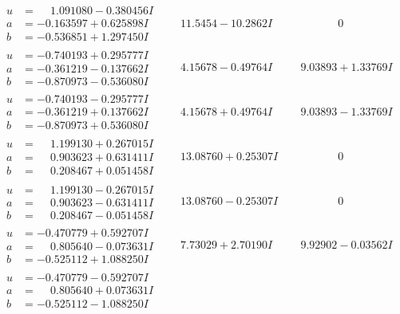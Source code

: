 \documentclass[1p]{elsarticle_modified}
\theoremstyle{definition}
\begin{document}
$$\begin{array}{c|c|c}
\begin{aligned}
u &= \phantom{-}1.091080 - 0.380456 I \\
a &= -0.163597 + 0.625898 I \\
b &= -0.536851 + 1.297450 I\end{aligned}
 & \phantom{-}11.5454 - 10.2862 I & \phantom{-0.000000 } 0 \\ \hline\begin{aligned}
u &= -0.740193 + 0.295777 I \\
a &= -0.361219 - 0.137662 I \\
b &= -0.870973 - 0.536080 I\end{aligned}
 & \phantom{-}4.15678 - 0.49764 I & \phantom{-}9.03893 + 1.33769 I \\ \hline\begin{aligned}
u &= -0.740193 - 0.295777 I \\
a &= -0.361219 + 0.137662 I \\
b &= -0.870973 + 0.536080 I\end{aligned}
 & \phantom{-}4.15678 + 0.49764 I & \phantom{-}9.03893 - 1.33769 I \\ \hline\begin{aligned}
u &= \phantom{-}1.199130 + 0.267015 I \\
a &= \phantom{-}0.903623 + 0.631411 I \\
b &= \phantom{-}0.208467 + 0.051458 I\end{aligned}
 & \phantom{-}13.08760 + 0.25307 I & \phantom{-0.000000 } 0 \\ \hline\begin{aligned}
u &= \phantom{-}1.199130 - 0.267015 I \\
a &= \phantom{-}0.903623 - 0.631411 I \\
b &= \phantom{-}0.208467 - 0.051458 I\end{aligned}
 & \phantom{-}13.08760 - 0.25307 I & \phantom{-0.000000 } 0 \\ \hline\begin{aligned}
u &= -0.470779 + 0.592707 I \\
a &= \phantom{-}0.805640 - 0.073631 I \\
b &= -0.525112 + 1.088250 I\end{aligned}
 & \phantom{-}7.73029 + 2.70190 I & \phantom{-}9.92902 - 0.03562 I \\ \hline\begin{aligned}
u &= -0.470779 - 0.592707 I \\
a &= \phantom{-}0.805640 + 0.073631 I \\
b &= -0.525112 - 1.088250 I\end{aligned}

\end{array}$$
\end{document}
